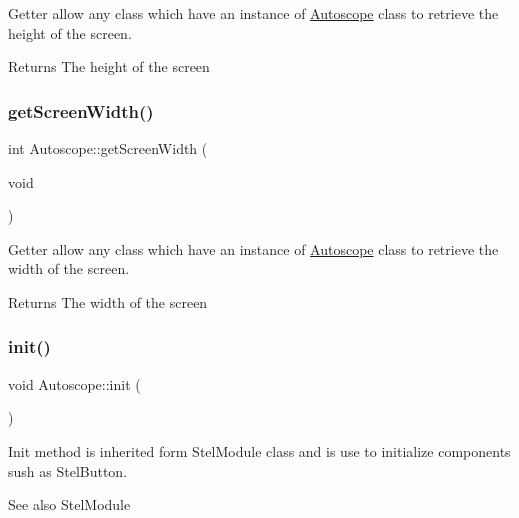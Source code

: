 Getter allow any class which have an instance of \mbox{\hyperlink{class_autoscope}{Autoscope}} class to retrieve the height of the screen. 

\begin{DoxyReturn}{Returns}
The height of the screen 
\end{DoxyReturn}
\mbox{\label{class_autoscope_a0e438a40043c916a7f0f98a30221de11}} 
\subsubsection{\texorpdfstring{getScreenWidth()}{getScreenWidth()}}
{\footnotesize\ttfamily int Autoscope\+::get\+Screen\+Width (\begin{DoxyParamCaption}\item[{void}]{ }\end{DoxyParamCaption})\hspace{0.3cm}{\ttfamily [inline]}}



Getter allow any class which have an instance of \mbox{\hyperlink{class_autoscope}{Autoscope}} class to retrieve the width of the screen. 

\begin{DoxyReturn}{Returns}
The width of the screen 
\end{DoxyReturn}
\mbox{\label{class_autoscope_a0aaa7e7edbdd749e209dc42ee360f3a5}} 
\subsubsection{\texorpdfstring{init()}{init()}}
{\footnotesize\ttfamily void Autoscope\+::init (\begin{DoxyParamCaption}{ }\end{DoxyParamCaption})\hspace{0.3cm}{\ttfamily [virtual]}}



Init method is inherited form Stel\+Module class and is use to initialize components sush as Stel\+Button. 

\begin{DoxySeeAlso}{See also}
Stel\+Module 
\end{DoxySeeAlso}
\mbox{\label{class_autoscope_af24c123f39ace0191799b5c20ceca7a6}} 
